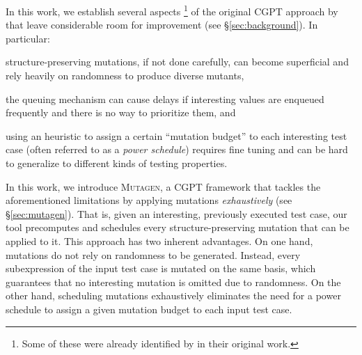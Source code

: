 \documentclass[sigconf, anonymous, review]{acmart}
\newcommand{\fuzzchick}{\textit{FuzzChick}\xspace}
\newcommand{\mutagen}{\textsc{Mutagen}\xspace}
\begin{document}
In this work, we establish several aspects%
\footnote{Some of these were already identified by
  \citeauthor{lampropoulos2019coverage} in their original work.}
%
of the original CGPT approach by \citeauthor{lampropoulos2019coverage} that
leave considerable room for improvement (see \S \ref{sec:background}).
%
In particular:
%
\begin{inparaenum}
\item structure-preserving mutations, if not done carefully, can become
  superficial and rely heavily on randomness to produce diverse mutants,
\item the queuing mechanism can cause delays if interesting values are enqueued
  frequently and there is no way to prioritize them, and
\item using an heuristic to assign a certain ``mutation budget'' to each
  interesting test case (often referred to as a \emph{power schedule}) requires
  fine tuning and can be hard to generalize to different kinds of testing
  properties.
\end{inparaenum}
%


In this work, we introduce \mutagen, a CGPT framework that tackles the
aforementioned limitations by applying mutations \emph{exhaustively} (see
\S \ref{sec:mutagen}).
%
%
%
%
%
%
That is, given an interesting, previously executed test case, our tool
precomputes and schedules every structure-preserving mutation that can be
applied to it.
%
This approach has two inherent advantages. %
%
On one hand, mutations do not rely on randomness to be generated.
%
Instead, every subexpression of the input test case is mutated on the same
basis, which guarantees that no interesting mutation is omitted due to
randomness.
%
%
On the other hand, scheduling mutations exhaustively eliminates the need for a
power schedule to assign a given mutation budget to each input test case.
\end{document}
